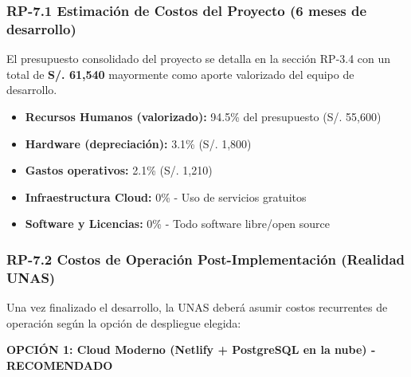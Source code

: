\documentclass[12pt,a4paper]{article}
\begin{document}
\subsubsection{RP-7.1 Estimación de Costos del Proyecto (6 meses de desarrollo)}

El presupuesto consolidado del proyecto se detalla en la sección RP-3.4 con un total de \textbf{S/. 61,540} mayormente como aporte valorizado del equipo de desarrollo.

\begin{itemize}[noitemsep]
    \item \textbf{Recursos Humanos (valorizado):} 94.5\% del presupuesto (S/. 55,600)
    \item \textbf{Hardware (depreciación):} 3.1\% (S/. 1,800)
    \item \textbf{Gastos operativos:} 2.1\% (S/. 1,210)
    \item \textbf{Infraestructura Cloud:} 0\% - Uso de servicios gratuitos
    \item \textbf{Software y Licencias:} 0\% - Todo software libre/open source
\end{itemize}

\subsubsection{RP-7.2 Costos de Operación Post-Implementación (Realidad UNAS)}

Una vez finalizado el desarrollo, la UNAS deberá asumir costos recurrentes de operación según la opción de despliegue elegida:

\textbf{OPCIÓN 1: Cloud Moderno (Netlify + PostgreSQL en la nube) - RECOMENDADO}
\end{document}
